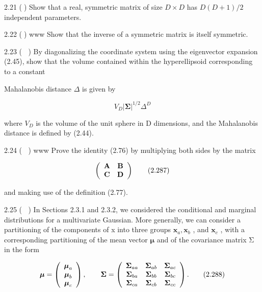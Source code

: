 \documentclass[
  10
]{article}
\begin{document}
2.21 () Show that a real, symmetric matrix of size \(D \times D\) has
\(D ( D + 1 ) / 2\) independent parameters.

2.22 () www Show that the inverse of a symmetric matrix is itself
symmetric.

2.23 ( ) By diagonalizing the coordinate system using the eigenvector
expansion (2.45), show that the volume contained within the
hyperellipsoid corresponding to a constant

Mahalanobis distance \(\Delta\) is given by

\[
V _ {D} | \pmb {\Sigma} | ^ {1 / 2} \Delta^ {D}\tag{2.286}
\]

where \(V _ { D }\) is the volume of the unit sphere in D dimensions,
and the Mahalanobis distance is defined by (2.44).

2.24 ( ) www Prove the identity (2.76) by multiplying both sides by the
matrix

\[
\left( \begin{array}{c c} \mathbf {A} & \mathbf {B} \\ \mathbf {C} & \mathbf {D} \end{array} \right)\tag{2.287}
\]

and making use of the definition (2.77).

2.25 ( ) In Sections 2.3.1 and 2.3.2, we considered the conditional and
marginal distributions for a multivariate Gaussian. More generally, we
can consider a partitioning of the components of x into three groups
\(\mathbf { x } _ { a } , \mathbf { x } _ { b }\) , and
\(\mathbf { x } _ { c }\) , with a corresponding partitioning of the
mean vector \(\pmb { \mu }\) and of the covariance matrix Σ in the form

\[
\boldsymbol {\mu} = \left( \begin{array}{c} \boldsymbol {\mu} _ {a} \\ \boldsymbol {\mu} _ {b} \\ \boldsymbol {\mu} _ {c} \end{array} \right), \qquad \boldsymbol {\Sigma} = \left( \begin{array}{c c c} \boldsymbol {\Sigma} _ {a a} & \boldsymbol {\Sigma} _ {a b} & \boldsymbol {\Sigma} _ {a c} \\ \boldsymbol {\Sigma} _ {b a} & \boldsymbol {\Sigma} _ {b b} & \boldsymbol {\Sigma} _ {b c} \\ \boldsymbol {\Sigma} _ {c a} & \boldsymbol {\Sigma} _ {c b} & \boldsymbol {\Sigma} _ {c c} \end{array} \right).\tag{2.288}
\]
\end{document}
